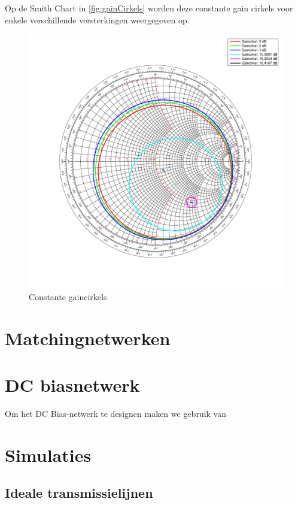   Op de Smith Chart \cite{smithchart} in \autoref{fig:gainCirkels} worden deze
  constante gain cirkels voor enkele verschillende
  versterkingen weergegeven op.
  \begin{figure}[!h]
      \centering
      \includegraphics[width=\textwidth,keepaspectratio=true]{fig/gaincirkels.pdf}  
      \caption{Constante gaincirkels} 
      \label{fig:gainCirkels}
    \end{figure}
  

\section{Matchingnetwerken}

\section{DC biasnetwerk}
  Om het DC Bias-netwerk te designen maken we gebruik van \cite{Gonzalez}

\section{Simulaties}
  \subsection{Ideale transmissielijnen}

